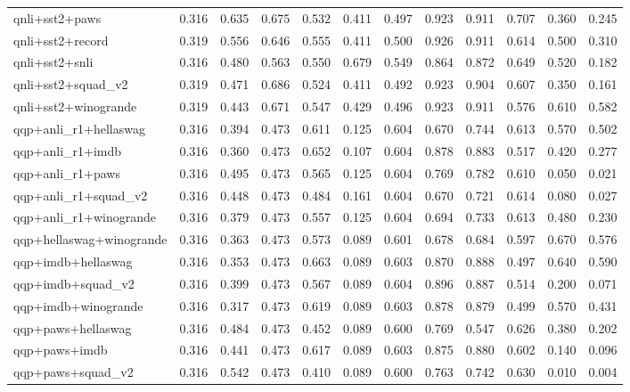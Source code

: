 \begin{table}[t]
\begin{tabular}{lrrrrrrrrrrr}
    qnli+sst2+paws & 0.316 & 0.635 & 0.675 & 0.532 & 0.411 & 0.497 & 0.923 & 0.911 & 0.707 & 0.360 & 0.245 \\
    qnli+sst2+record & 0.319 & 0.556 & 0.646 & 0.555 & 0.411 & 0.500 & 0.926 & 0.911 & 0.614 & 0.500 & 0.310 \\
    qnli+sst2+snli & 0.316 & 0.480 & 0.563 & 0.550 & 0.679 & 0.549 & 0.864 & 0.872 & 0.649 & 0.520 & 0.182 \\
    qnli+sst2+squad\_v2 & 0.319 & 0.471 & 0.686 & 0.524 & 0.411 & 0.492 & 0.923 & 0.904 & 0.607 & 0.350 & 0.161 \\
    qnli+sst2+winogrande & 0.319 & 0.443 & 0.671 & 0.547 & 0.429 & 0.496 & 0.923 & 0.911 & 0.576 & 0.610 & 0.582 \\
    qqp+anli\_r1+hellaswag & 0.316 & 0.394 & 0.473 & 0.611 & 0.125 & 0.604 & 0.670 & 0.744 & 0.613 & 0.570 & 0.502 \\
    qqp+anli\_r1+imdb & 0.316 & 0.360 & 0.473 & 0.652 & 0.107 & 0.604 & 0.878 & 0.883 & 0.517 & 0.420 & 0.277 \\
    qqp+anli\_r1+paws & 0.316 & 0.495 & 0.473 & 0.565 & 0.125 & 0.604 & 0.769 & 0.782 & 0.610 & 0.050 & 0.021 \\
    qqp+anli\_r1+squad\_v2 & 0.316 & 0.448 & 0.473 & 0.484 & 0.161 & 0.604 & 0.670 & 0.721 & 0.614 & 0.080 & 0.027 \\
    qqp+anli\_r1+winogrande & 0.316 & 0.379 & 0.473 & 0.557 & 0.125 & 0.604 & 0.694 & 0.733 & 0.613 & 0.480 & 0.230 \\
    qqp+hellaswag+winogrande & 0.316 & 0.363 & 0.473 & 0.573 & 0.089 & 0.601 & 0.678 & 0.684 & 0.597 & 0.670 & 0.576 \\
    qqp+imdb+hellaswag & 0.316 & 0.353 & 0.473 & 0.663 & 0.089 & 0.603 & 0.870 & 0.888 & 0.497 & 0.640 & 0.590 \\
    qqp+imdb+squad\_v2 & 0.316 & 0.399 & 0.473 & 0.567 & 0.089 & 0.604 & 0.896 & 0.887 & 0.514 & 0.200 & 0.071 \\
    qqp+imdb+winogrande & 0.316 & 0.317 & 0.473 & 0.619 & 0.089 & 0.603 & 0.878 & 0.879 & 0.499 & 0.570 & 0.431 \\
    qqp+paws+hellaswag & 0.316 & 0.484 & 0.473 & 0.452 & 0.089 & 0.600 & 0.769 & 0.547 & 0.626 & 0.380 & 0.202 \\
    qqp+paws+imdb & 0.316 & 0.441 & 0.473 & 0.617 & 0.089 & 0.603 & 0.875 & 0.880 & 0.602 & 0.140 & 0.096 \\
    qqp+paws+squad\_v2 & 0.316 & 0.542 & 0.473 & 0.410 & 0.089 & 0.600 & 0.763 & 0.742 & 0.630 & 0.010 & 0.004 \\

\end{tabular}
\end{table}

